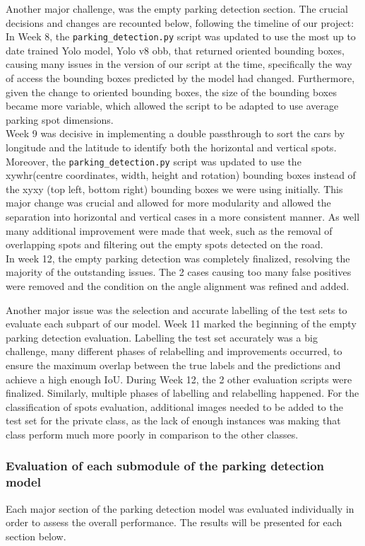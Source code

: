 Another major challenge, was the empty parking detection section. The crucial decisions and changes are recounted below, following the timeline of our project: \\
In Week 8, the \texttt{parking\_detection.py} script was updated to use the most up to date trained Yolo model, Yolo v8 obb, that returned oriented bounding boxes, causing many issues in the version of our script at the time, specifically the way of access the bounding boxes predicted by the model had changed.
Furthermore, given the change to oriented bounding boxes, the size of the bounding boxes became more variable, which allowed the script to be adapted to use average parking spot dimensions.\\
Week 9 was decisive in implementing a double passthrough to sort the cars by longitude and the latitude to identify both the horizontal and vertical spots.
Moreover, the \texttt{parking\_detection.py} script was updated to use the xywhr(centre coordinates, width, height and rotation) bounding boxes instead of the xyxy (top left, bottom right)  bounding boxes we were using initially.
This major change was crucial and allowed for more modularity and allowed the separation into horizontal and vertical cases in a more consistent manner. As well many additional improvement were made that week, such as the removal of overlapping spots and filtering out the empty spots detected on the road.\\
In week 12, the empty parking detection was completely finalized, resolving the majority of the outstanding issues. The 2 cases causing too many false positives were removed and the condition on the angle alignment was refined and added.

Another major issue was the selection and accurate labelling of the test sets to evaluate each subpart of our model.
Week 11 marked the beginning of the empty parking detection evaluation. Labelling the test set accurately was a big challenge, many different phases of relabelling and improvements occurred, to ensure the maximum overlap between the true labels and the predictions and achieve a high enough IoU.
During Week 12, the 2 other evaluation scripts were finalized. Similarly, multiple phases of labelling and relabelling happened. For the classification of spots evaluation, additional images needed to be added to the test set for the private class, as the lack of enough instances was making that class perform much more poorly in comparison to the other classes.

\subsubsection{Evaluation of each submodule of the parking detection model}
Each major section of the parking detection model was evaluated individually in order to assess the overall performance. The results will be presented for each section below.


